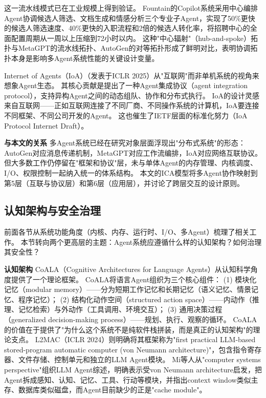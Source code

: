 这一流水线模式已在工业规模上得到验证。
Fountain的Copilot系统采用中心编排Agent协调候选人筛选、文档生成和情感分析三个专业子Agent，实现了50\%更快的候选人筛选速度、40\%更快的入职流程和2倍的候选人转化率，将招聘中心的全面配置周期从一周以上压缩到72小时以内\cite{anthropic2026agenticreport}。
这种"中心辐射"（hub-and-spoke）拓扑与MetaGPT的流水线拓扑、AutoGen的对等拓扑形成了鲜明对比，表明协调拓扑本身是影响多Agent系统性能的关键设计变量\cite{wu2023autogen,metagpt2023}。

Internet of Agents（IoA）\cite{ioa2024}（发表于ICLR 2025）从"互联网"而非单机系统的视角来想象Agent生态。
其核心贡献是提出了一种Agent集成协议（agent integration protocol），支持异构Agent之间的动态组队、协作和分布式执行。
IoA的设计灵感来自互联网——正如互联网连接了不同厂商、不同操作系统的计算机，IoA要连接不同框架、不同公司开发的Agent。
这也催生了IETF层面的标准化努力（IoA Protocol Internet Draft）。

\textbf{与本文的关系}
多Agent系统已经在研究对象层面浮现出"分布式系统"的形态：AutoGen对应消息传递机制，MetaGPT对应工作流编排，IoA对应网络互联协议。
但大多数工作仍停留在"框架和协议"层，未与单体Agent的内存管理、内核调度、I/O、权限控制一起纳入统一的体系结构。
本文的ICA模型将多Agent协作映射到第5层（互联与协议层）和第6层（应用层），并讨论了跨层交互的设计原则。

\subsection{认知架构与安全治理}
\label{sec:related-cognition-security}

前面各节从系统功能角度（内核、内存、运行时、I/O、多Agent）梳理了相关工作。
本节转向两个更高层的主题：Agent系统应遵循什么样的认知架构？如何治理其安全性？

\textbf{认知架构}
CoALA（Cognitive Architectures for Language Agents）\cite{sumers2024coala}从认知科学角度提供了一个理论框架。
CoALA将语言Agent组织为三个核心组件：
(1) 模块化记忆（modular memory）——分为短期工作记忆和长期记忆（语义记忆、情景记忆、程序记忆）；
(2) 结构化动作空间（structured action space）——内动作（推理、记忆检索）与外动作（工具调用、环境交互）；
(3) 通用决策过程（generalized decision-making process）——规划、执行、观察的循环。
CoALA的价值在于提供了"为什么这个系统不是纯软件栈拼装，而是真正的认知架构"的理论支点。
L2MAC\cite{holt2024l2mac}（ICLR 2024）则明确将其框架称为"first practical LLM-based stored-program automatic computer (von Neumann architecture)"，包含指令寄存器、文件存储、控制单元和独立的LLM Agent模块。
Mi等人\cite{mi2025llmagentscomputersystems}从"computer systems perspective"组织LLM Agent综述，明确表示受von Neumann architecture启发，把Agent拆成感知、认知、记忆、工具、行动等模块，并指出context window类似主存、数据库类似磁盘，而Agent目前缺少的正是"cache module"。

